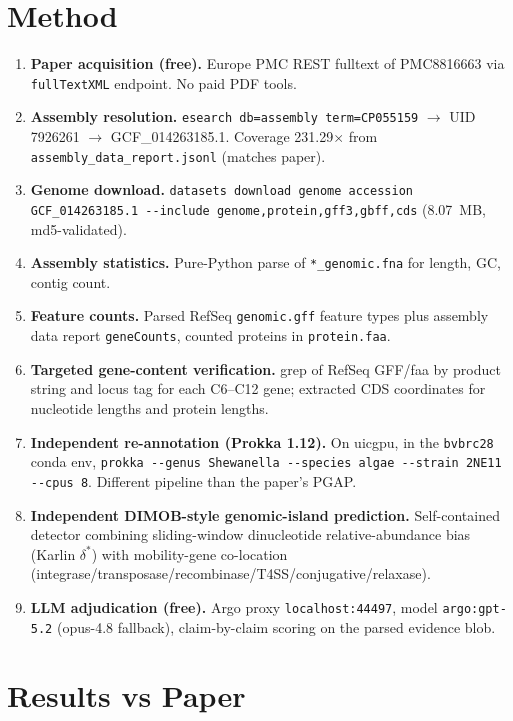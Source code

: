 \documentclass[11pt]{article}
\begin{document}
\section{Method}
\begin{enumerate}
  \item \textbf{Paper acquisition (free).} Europe PMC REST fulltext of PMC8816663
        via \texttt{fullTextXML} endpoint. No paid PDF tools.
  \item \textbf{Assembly resolution.} \texttt{esearch db=assembly term=CP055159}
        $\to$ UID 7926261 $\to$ GCF\_014263185.1. Coverage 231.29$\times$ from
        \texttt{assembly\_data\_report.jsonl} (matches paper).
  \item \textbf{Genome download.} \texttt{datasets download genome accession
        GCF\_014263185.1 -{}-include genome,protein,gff3,gbff,cds} (8.07~MB,
        md5-validated).
  \item \textbf{Assembly statistics.} Pure-Python parse of \texttt{*\_genomic.fna}
        for length, GC, contig count.
  \item \textbf{Feature counts.} Parsed RefSeq \texttt{genomic.gff} feature types
        plus assembly data report \texttt{geneCounts}, counted proteins in
        \texttt{protein.faa}.
  \item \textbf{Targeted gene-content verification.} grep of RefSeq GFF/faa by
        product string and locus tag for each C6--C12 gene; extracted CDS
        coordinates for nucleotide lengths and protein lengths.
  \item \textbf{Independent re-annotation (Prokka 1.12).} On uicgpu, in the
        \texttt{bvbrc28} conda env, \texttt{prokka -{}-genus Shewanella
        -{}-species algae -{}-strain 2NE11 -{}-cpus 8}. Different pipeline than
        the paper's PGAP.
  \item \textbf{Independent DIMOB-style genomic-island prediction.} Self-contained
        detector combining sliding-window dinucleotide relative-abundance bias
        (Karlin $\delta^*$) with mobility-gene co-location
        (integrase/transposase/recombinase/T4SS/conjugative/relaxase).
  \item \textbf{LLM adjudication (free).} Argo proxy \texttt{localhost:44497},
        model \texttt{argo:gpt-5.2} (opus-4.8 fallback), claim-by-claim scoring
        on the parsed evidence blob.
\end{enumerate}

\section{Results vs Paper}
\end{document}
